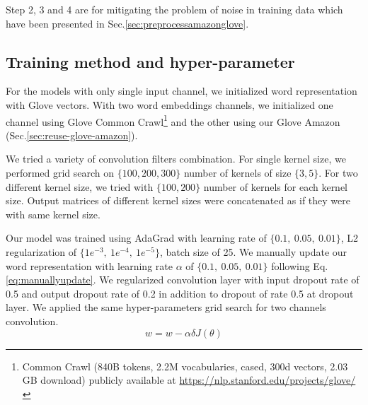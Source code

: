 Step 2, 3 and 4 are for mitigating the problem of noise in training data which have been presented in Sec.\ref{sec:preprocessamazonglove}.

\subsection{Training method and hyper-parameter}
For the models with only single input channel, we initialized word representation with Glove vectors\cite{glove}. 
With two word embeddings channels, we initialized one channel using Glove Common Crawl\footnote{\label{glovecommoncrawl}Common Crawl (840B tokens, 2.2M vocabularies, cased, 300d vectors, 2.03 GB download) publicly available at \url{https://nlp.stanford.edu/projects/glove/}} and the other using our Glove Amazon (Sec.\ref{sec:reuse-glove-amazon}). 

We tried a variety of convolution filters combination. 
For single kernel size, we performed grid search on $\{100, 200, 300\}$ number of kernels of size $\{3, 5\}$. 
For two different kernel size, we tried with $\{100, 200\}$ number of kernels for each kernel size. 
Output matrices of different kernel sizes were concatenated as if they were with same kernel size. 

Our model was trained using AdaGrad \cite{duchi2011adaptive} with learning rate of $\{0.1,~ 0.05,~ 0.01\}$, L2 regularization of $\{1e^{-3},~ 1e^{-4}, ~ 1e^{-5} \}$, batch size of 25. 
We manually update our word representation with learning rate $\alpha$ of $\{0.1,~0.05, ~0.01\}$ following Eq.\ref{eq:manuallyupdate}. 
We regularized convolution layer with input dropout rate of 0.5 and output dropout rate of 0.2 in addition to dropout of rate 0.5 at dropout layer. 
We applied the same hyper-parameters grid search for two channels convolution. 
\begin{equation}
\label{eq:manuallyupdate}
w = w - \alpha\delta J(\theta)
\end{equation}
